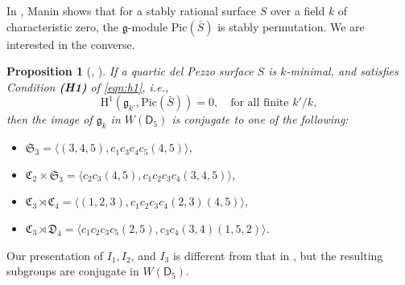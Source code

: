 \documentclass[12pt, reqno]{amsart}
\theoremstyle{plain}
\newtheorem{prop}{Proposition}[section]
\theoremstyle{remark}
\theoremstyle{definition}
\numberwithin{equation}{section}
\def\sD{{\mathsf D}}
\def\fC{{\mathfrak C}}
\def\fD{{\mathfrak D}}
\def\fS{{\mathfrak S}}
\def\fS{{\mathfrak S}}
\def\rH{{\mathrm H}}
\def\Pic{\mathrm{Pic}}
\begin{document}
In \cite{Maninperfect},  Manin shows 
that for a stably rational surface $S$ over a field $k$ of characteristic zero, the $\mathfrak g$-module $\Pic(\bar{S})$ is stably permutation. We are interested in the converse.

\begin{prop}[{\cite{KSS}, \cite{TY}}]\label{prop:h1}
    If a quartic del Pezzo surface $S$ is $k$-minimal, and satisfies Condition {\bf (H1)} of \eqref{eqn:h1}, i.e., 
    $$
    \rH^1(\mathfrak g_{k'},\Pic(\bar{S}))=0,\quad \text{for all finite } k'/k,
    $$
   then the image of $\mathfrak g_{k}$ in $W(\sD_5)$ is conjugate to one of the following:
   \begin{itemize}
       \item[$(I_0):$] $\fS_3=\langle (3,4,5),c_1c_3c_4c_5(4,5)\rangle$,
         \item[$(I_1):$] $\fC_2\times\fS_3=\langle c_2c_3(4,5),c_1c_2c_3c_4(3,4,5)\rangle$,
           \item[$(I_2):$] $\fC_3\rtimes\fC_4=\langle (1,2,3),c_1c_2c_3c_4(2,3)(4,5)\rangle$,
             \item[$(I_3):$] $\fC_3\rtimes\fD_4=\langle c_1c_2c_3c_5(2,5),c_3c_4(3,4)(1,5,2)\rangle$.
   \end{itemize}
   \end{prop}
Our presentation of $I_1, I_2$, and $I_3$ is different from that in \cite[Theorem 5.20]{KSS}, but the resulting subgroups are conjugate  in $W(\sD_5).$
\end{document}

